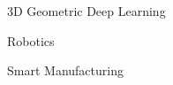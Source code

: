 


\begin{cventries}

\cvtext
{ %
\begin{cvitems}
\item {3D Geometric Deep Learning}
\item {Robotics}
\item {Smart Manufacturing}
\end{cvitems}
}


\end{cventries}